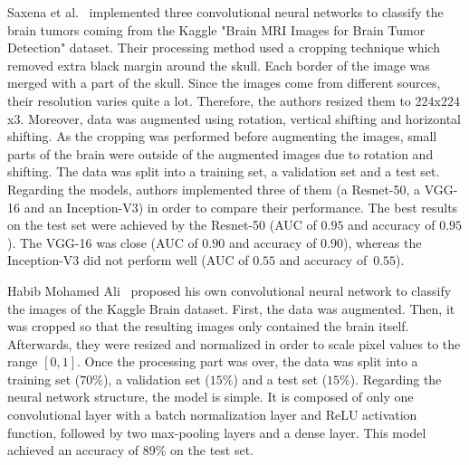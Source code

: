 Saxena et al.~\cite{31} implemented three convolutional neural networks to classify the brain tumors coming from the Kaggle "Brain MRI Images for Brain Tumor Detection" dataset. Their processing method used a cropping technique which removed extra black margin around the skull. Each border of the image was merged with a part of the skull. Since the images come from different sources, their resolution varies quite a lot. Therefore, the authors resized them to $224$x$224$x$3$. Moreover, data was augmented using rotation, vertical shifting and horizontal shifting. As the cropping was performed before augmenting the images, small parts of the brain were outside of the augmented images due to rotation and shifting. The data was split into a training set, a validation set and a test set. Regarding the models, authors implemented three of them (a Resnet-50, a VGG-16 and an Inception-V3) in order to compare their performance. The best results on the test set were achieved by the Resnet-50 (AUC of $0.95$ and accuracy of $0.95$). The VGG-16 was close (AUC of $0.90$ and accuracy of $0.90$), whereas the Inception-V3 did not perform well (AUC of $0.55$ and accuracy \mbox{of $0.55$}).

Habib Mohamed Ali~\cite{04} proposed his own convolutional neural network to classify the images of the Kaggle Brain dataset. First, the data was augmented. Then, it was cropped so that the resulting images only contained the brain itself. Afterwards, they were resized and normalized in order to scale pixel values to the range $[0,1]$. Once the processing part was over, the data was split into a training set ($70\%$), a validation set ($15\%$) and a test set ($15\%$). Regarding the neural network structure, the model is simple. It is composed of only one convolutional layer with a batch normalization layer and ReLU activation function, followed by two max-pooling layers and a dense layer. This model achieved an accuracy of $89\%$ on the test set.



